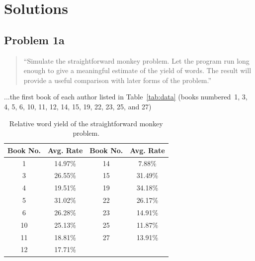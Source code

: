 \documentclass[conference]{IEEEtran}
\newcommand{\codefile}[1]{
  \begin{framed}
  \fontsize{5.65}{6.78}\selectfont
  
  \end{framed}
}
\begin{document}



\section{Solutions\label{sec:solutions}}



\subsection{Problem 1a}
\label{sec:problem1}

\begin{quote}
``Simulate the straightforward monkey problem. Let the program run long enough to 
give a meaningful estimate of the yield of words. The result will provide a 
useful comparison with later forms of the problem.''
\end{quote}

...the first book of each author listed in Table~\ref{tab:data} (books numbered~1, 
3, 4, 5, 6, 10, 11, 12, 14, 15, 19, 22, 23, 25, and 27)

\codefile{problem1a.py}

\begin{table}
\caption{Relative word yield of the straightforward monkey problem.\label{tab:problem1a}}
\vspace{-10pt}
\begin{center}
\begin{tabular}{cccc}
\hline
Book No. & Avg. Rate & Book No. & Avg. Rate \\
\hline
1  & 14.97\% & 14 & 7.88\% \\
3  & 26.55\% & 15 & 31.49\% \\
4  & 19.51\% & 19 & 34.18\% \\
5  & 31.02\% & 22 & 26.17\% \\
6  & 26.28\% & 23 & 14.91\% \\
10 & 25.13\% & 25 & 11.87\% \\
11 & 18.81\% & 27 & 13.91\% \\
12 & 17.71\% & & \\
\hline
\end{tabular}
\end{center}
\end{table}
\end{document}
